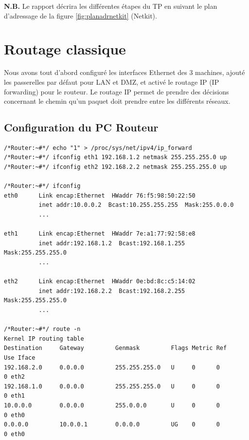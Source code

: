 \documentclass[frenchb, 11pt]{article}
\begin{document}
\noindent \textbf{N.B.} Le rapport décrira les différentes étapes du TP en suivant le plan d'adressage de la figure \ref{fig:planadrnetkit} (Netkit).


\newpage

\section{Routage classique}
Nous avons tout d'abord configuré les interfaces Ethernet des 3 machines, ajouté les passerelles par défaut pour LAN et DMZ, et activé le routage IP (IP forwarding) pour le routeur. Le routage IP permet de prendre des décisions concernant le chemin qu'un paquet doit prendre entre les différents réseaux.

\subsection{Configuration du PC Routeur}
\begin{lstlisting}
/*Router:~#*/ echo "1" > /proc/sys/net/ipv4/ip_forward
/*Router:~#*/ ifconfig eth1 192.168.1.2 netmask 255.255.255.0 up
/*Router:~#*/ ifconfig eth2 192.168.2.2 netmask 255.255.255.0 up

/*Router:~#*/ ifconfig
eth0      Link encap:Ethernet  HWaddr 76:f5:98:50:22:50
          inet addr:10.0.0.2  Bcast:10.255.255.255  Mask:255.0.0.0
          ...

eth1      Link encap:Ethernet  HWaddr 7e:a1:77:92:58:e8
          inet addr:192.168.1.2  Bcast:192.168.1.255  Mask:255.255.255.0
          ...

eth2      Link encap:Ethernet  HWaddr 0e:bd:8c:c5:14:02
          inet addr:192.168.2.2  Bcast:192.168.2.255  Mask:255.255.255.0
          ...

/*Router:~#*/ route -n
Kernel IP routing table
Destination     Gateway         Genmask         Flags Metric Ref    Use Iface
192.168.2.0     0.0.0.0         255.255.255.0   U     0      0        0 eth2
192.168.1.0     0.0.0.0         255.255.255.0   U     0      0        0 eth1
10.0.0.0        0.0.0.0         255.0.0.0       U     0      0        0 eth0
0.0.0.0         10.0.0.1        0.0.0.0         UG    0      0        0 eth0
\end{lstlisting}
\hfill
\end{document}
